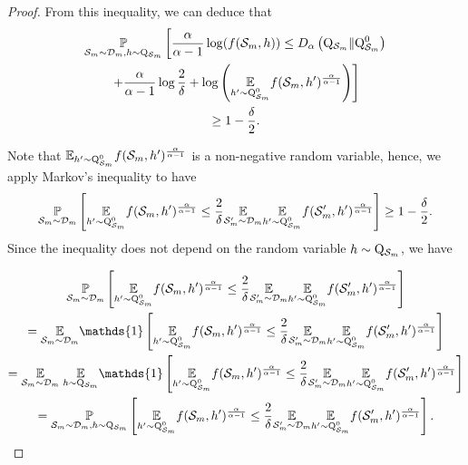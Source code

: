 \begin{proof}
From this inequality, we can deduce that
\begin{multline}
  \label{eq: viallard_dis_eq11}
  \underset{\mathcal{S}_m \sim \mathcal{D}_{m}, h \sim \mathrm{Q}_{\mathcal{S}_m}}{\mathbb{P}}\left[\frac{\alpha}{\alpha-1} \log (f(\mathcal{S}_m,h)) \leq D_{\alpha}\left(\mathrm{Q}_{\mathcal{S}_m} \| \mathrm{Q}_{\mathcal{S}_m}^0\right) \right.\\
  \left.+\frac{\alpha}{\alpha-1} \log \frac{2}{\delta}+\log \left(\underset{h^{\prime} \sim \mathrm{Q}_{\mathcal{S}_m}^0}{\mathbb{E}} f(\mathcal{S}_m,h')^{\frac{\alpha}{\alpha-1}}\right)\right] \\
  \geq 1-\frac{\delta}{2} .
\end{multline}


Note that $\mathbb{E}_{h^{\prime} \sim \mathrm{Q}_{\mathcal{S}_m}^0} f(\mathcal{S}_m,h')^{\frac{\alpha}{\alpha-1}}$ is a non-negative random variable, hence, we apply Markov's inequality to have
$$
\underset{\mathcal{S}_m \sim \mathcal{D}_{m}}{\mathbb{P}}\left[\underset{h^{\prime} \sim \mathrm{Q}_{\mathcal{S}_m}^0}{\mathbb{E}} f(\mathcal{S}_m,h')^{\frac{\alpha}{\alpha-1}} \leq \frac{2}{\delta} \underset{\mathcal{S}_m^{\prime} \sim \mathcal{D}_{m}}{\mathbb{E}} \underset{h^{\prime} \sim \mathrm{Q}_{\mathcal{S}_m}^0}{\mathbb{E}} f(\mathcal{S}_m',h')^{\frac{\alpha}{\alpha-1}}\right] \geq 1-\frac{\delta}{2} .
$$
Since the inequality does not depend on the random variable $h \sim \mathrm{Q}_{\mathcal{S}_m}$, we have

\begin{multline*}
\underset{\Sm \sim \Dm}{\mathbb{P}}\left[\underset{h^{\prime} \sim \Q_{\Sm}^0}{\mathbb{E}} f(\Sm,h')^{\frac{\alpha}{\alpha-1}} \leq \frac{2}{\delta} \underset{\Sm^{\prime} \sim \Dm}{\mathbb{E}} \underset{h^{\prime} \sim \Q_{\Sm}^0}{\mathbb{E}} f(\Sm',h')^{\frac{\alpha}{\alpha-1}}\right] \\
=\underset{\Sm \sim \Dm}{\mathbb{E}}\mathds{1}\left[\underset{h'\sim \Q_{\Sm}^0}{\mathbb{E}} f(\Sm,h')^{\frac{\alpha}{\alpha-1}} \leq \frac{2}{\delta} \underset{\Sm^{\prime} \sim \Dm}{\mathbb{E}} \underset{h^{\prime} \sim \Q_{\Sm}^0}{\mathbb{E}} f(\Sm',h')^{\frac{\alpha}{\alpha-1}}\right] \\
=\underset{\Sm \sim \Dm}{\mathbb{E}}\; \underset{h \sim \Q_{\Sm}}{\mathbb{E}} \mathds{1}\left[\underset{h^{\prime} \sim \Q_{\Sm}^0}{\mathbb{E}} f(\Sm,h')^{\frac{\alpha}{\alpha-1}} \leq \frac{2}{\delta} \underset{\Sm^{\prime} \sim \Dm}{\mathbb{E}} \underset{h^{\prime} \sim \Q_{\Sm}^0}{\mathbb{E}} f(\Sm',h')^{\frac{\alpha}{\alpha-1}}\right] \\
=\underset{\Sm \sim \Dm, h \sim \Q_{\Sm}}{\mathbb{P}}\left[\underset{h^{\prime} \sim \Q_{\Sm}^0}{\mathbb{E}} f(\Sm,h')^{\frac{\alpha}{\alpha-1}} \leq \frac{2}{\delta} \underset{\Sm^{\prime} \sim \Dm}{\mathbb{E}} \underset{h^{\prime} \sim \Q_{\Sm}^0}{\mathbb{E}} f(\Sm',h')^{\frac{\alpha}{\alpha-1}}\right] .
\end{multline*}


\end{proof}
